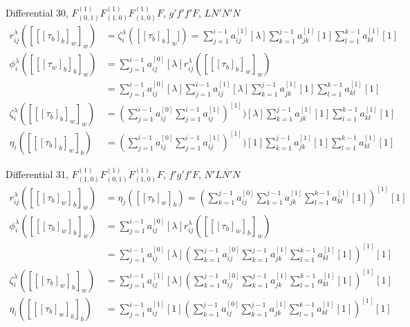 \documentclass[english,unicode]{article}
\begin{document}
Differential  30, $F^{(1)}_{(0,1)}F^{(1)}_{(1,0)}F^{(1)}_{(1,0)}F$, $g'f'f'F$, $LN'N'N$ 
\begin{align*}
r_{ij}^\lambda([[[\tau_b]_b]_w]_w)& =\zeta_i^{\lambda}([[\tau_b]_b]_w])=\sum_{j=1}^{i-1}a_{ij}^{[1]}[\lambda]\sum_{k=1}^{j-1}a_{jk}^{[1]}[1]\sum_{l=1}^{k-1}a_{kl}^{[1]}[1]\\
\phi_i^\lambda([[[\tau_w]_b]_b]_w)&= \sum_{j=1}^{i-1}a_{ij}^{[0]}[\lambda]r_{ij}^\lambda ([[[\tau_b]_b]_w]_w)\\
& = \sum_{j=1}^{i-1}a_{ij}^{[0]}[\lambda]\sum_{j=1}^{i-1}a_{ij}^{[1]}[\lambda]\sum_{k=1}^{j-1}a_{jk}^{[1]}[1]\sum_{l=1}^{k-1}a_{kl}^{[1]}[1]\\
\zeta_i^\lambda([[[\tau_b]_b]_w]_w)& =(\sum_{j=1}^{i-1}a_{ij}^{[0]}\sum_{j=1}^{i-1}a_{ij}^{[1]})^{[1]})[\lambda]\sum_{k=1}^{j-1}a_{jk}^{[1]}[1]\sum_{l=1}^{k-1}a_{kl}^{[1]}[1]\\
\eta_i([[[\tau_b]_b]_w]_b)& =(\sum_{j=1}^{i-1}a_{ij}^{[0]}\sum_{j=1}^{i-1}a_{ij}^{[1]})^{[1]})[1]\sum_{k=1}^{j-1}a_{jk}^{[1]}[1]\sum_{l=1}^{k-1}a_{kl}^{[1]}[1]\
\end{align*}

Differential 31, $F^{(1)}_{(1,0)}F^{(1)}_{(0,1)}F^{(1)}_{(1,0)}F$, $f'g'f'F$,  $N'LN'N$
 \begin{align*}
r_{ij}^\lambda([[[\tau_b]_w]_b]_w)& =\eta_j([[\tau_b]_w]_b) =( \sum_{k=1}^{j-1}a_{ij}^{[0]}\sum_{k=1}^{j-1}a_{jk}^{[1]}\sum_{l=1}^{k-1} a_{kl}^{[1]}[1])^{[1]}[1]\\
\phi_i^\lambda([[[\tau_b]_w]_b]_w)&= \sum_{j=1}^{i-1}a_{ij}^{[0]}[\lambda]r_{ij}^\lambda ([[[\tau_b]_w]_b]_w)\\
& = \sum_{j=1}^{i-1}a_{ij}^{[0]}[\lambda]( \sum_{k=1}^{j-1}a_{ij}^{[0]}\sum_{k=1}^{j-1}a_{jk}^{[1]}\sum_{l=1}^{k-1} a_{kl}^{[1]}[1])^{[1]}[1]\\
\zeta_i^\lambda([[[\tau_b]_w]_b]_w) & =\sum_{j=1}^{i-1}a_{ij}^{[1]}[\lambda]( \sum_{k=1}^{j-1}a_{ij}^{[0]}\sum_{k=1}^{j-1}a_{jk}^{[1]}\sum_{l=1}^{k-1} a_{kl}^{[1]}[1])^{[1]}[1]\\
\eta_i([[[\tau_b]_w]_b]_b) & =\sum_{j=1}^{i-1}a_{ij}^{[1]}[1]( \sum_{k=1}^{j-1}a_{ij}^{[0]}\sum_{k=1}^{j-1}a_{jk}^{[1]}\sum_{l=1}^{k-1} a_{kl}^{[1]}[1])^{[1]}[1]\\
\end{align*}
\end{document}
